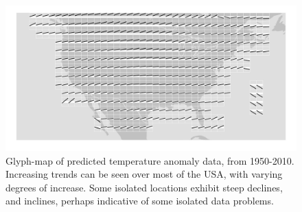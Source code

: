 \documentclass[oneside]{article}
\begin{document}
\begin{figure}[htbp]
  \centering
  \includegraphics[width=1\linewidth]{gistemp-pred}%

  \caption{Glyph-map of predicted temperature anomaly data, from
    1950-2010. Increasing trends can be seen over most of the USA,
    with varying degrees of increase. Some isolated locations exhibit
    steep declines, and inclines, perhaps indicative of some isolated
    data problems.}
  \label{fig:gistemp-pred}
\end{figure}

\end{document}
